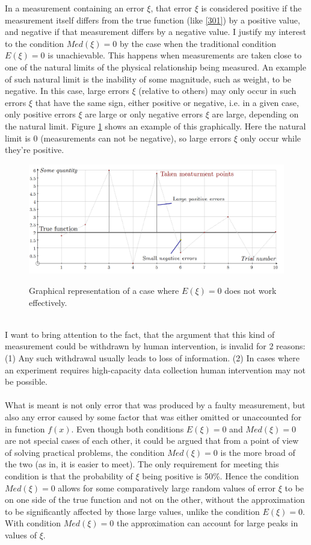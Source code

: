 In a measurement containing an error $\xi$, that error $\xi$ is considered positive if the measurement itself differs from the true function (like \vref{301}) by a positive value, and negative if that measurement differs by a negative value. I justify my interest to the condition $Med(\xi)=0$ by the case when the traditional condition $E(\xi)=0$ is unachievable. This happens when measurements are taken close to one of the natural limits of the physical relationship being measured. An example of such natural limit is the inability of some magnitude, such as weight, to be negative. In this case, large errors $\xi$ (relative to others) may only occur in such errors $\xi$ that have the same sign, either positive or negative, i.e. in a given case, only positive errors $\xi$ are large or only negative errors $\xi$ are large, depending on the natural limit. Figure \ref{fig:graph-nl} shows an example of this graphically. Here the natural limit is 0 (measurements can not be negative), so large errors $\xi$ only occur while they're positive.
\begin{figure}[h!]
\caption{Graphical representation of a case where $E(\xi)=0$ does not work effectively.}
\includegraphics[scale=0.35]{updated/fig1}
\centering
\label{fig:graph-nl}
\end{figure}
\\
I want to bring attention to the fact, that the argument that this kind of measurement could be withdrawn by human intervention, is invalid for 2 reasons: (1) Any such withdrawal usually leads to loss of information. (2) In cases where an experiment requires high-capacity data collection human intervention may not be possible.\\
\\
What is meant is not only error that was produced by a faulty measurement, but also any error caused by some factor that was either omitted or unaccounted for in function $f(x)$. Even though both conditions $E(\xi)=0$ and $Med(\xi)=0$ are not special cases of each other, it could be argued that from a point of view of solving practical problems, the condition $Med(\xi)=0$ is the more broad of the two (as in, it is easier to meet). The only requirement for meeting this condition is that the probability of $\xi$ being positive is 50\%.  Hence the condition $Med(\xi)=0$ allows for some comparatively large random values of error $\xi$ to be on one side of the true function and not on the other, without the approximation to be significantly affected by those large values, unlike the condition $E(\xi)=0$. With condition $Med(\xi)=0$ the approximation can account for large peaks in values of $\xi$.\\
